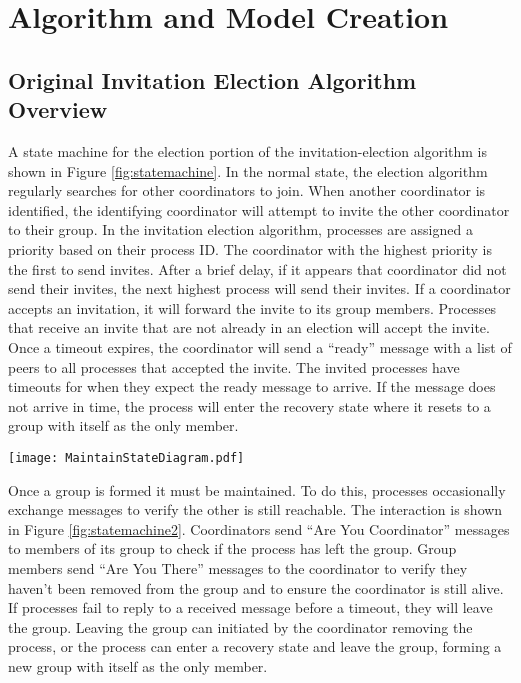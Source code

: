 \chapter{Algorithm and Model Creation}

\section{Original Invitation Election Algorithm Overview}

A state machine for the election portion of the invitation-election algorithm is shown in Figure \ref{fig:statemachine}.
In the normal state, the election algorithm regularly searches for other coordinators to join.
When another coordinator is identified, the identifying coordinator will attempt to invite the other coordinator to their group.
In the invitation election algorithm, processes are assigned a priority based on their process ID.
The coordinator with the highest priority is the first to send invites.
After a brief delay, if it appears that coordinator did not send their invites, the next highest process will send their invites.
If a coordinator accepts an invitation, it will forward the invite to its group members.
Processes that receive an invite that are not already in an election will accept the invite.
Once a timeout expires, the coordinator will send a ``ready'' message with a list of peers to all processes that accepted the invite.
The invited processes have timeouts for when they expect the ready message to arrive.
If the message does not arrive in time, the process will enter the recovery state where it resets to a group with itself as the only member.

\begin{figure*}[!t]
\texttt{[image: MaintainStateDiagram.pdf]}
\caption[State machine for maintaining a group]{State machine for maintaining a group. The \ac{AYC} messages are the same as those in Figure \ref{fig:statemachine}. \ac{AYC} and \ac{AYT} are periodically sent by processes, and responses to those messages are immediately sent by the receiving process. In the modified algorithm, the member does not enter the recovery state if they do not receive an AYT response before the timeout expires.}
\label{fig:statemachine2}
\end{figure*}

Once a group is formed it must be maintained.
To do this, processes occasionally exchange messages to verify the other is still reachable.
The interaction is shown in Figure \ref{fig:statemachine2}.
Coordinators send ``Are You Coordinator'' messages to members of its group to check if the process has left the group.
Group members send ``Are You There'' messages to the coordinator to verify they haven't been removed from the group and to ensure the coordinator is still alive.
If processes fail to reply to a received message before a timeout, they will leave the group.
Leaving the group can initiated by the coordinator removing the process, or the process can enter a recovery state and leave the group, forming a new group with itself as the only member.

